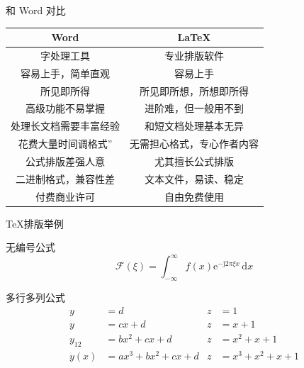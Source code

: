 \documentclass[xcolor=table,svgnames]{beamer}
\begin{document}
\begin{frame}{和 Word 对比}
  \begin{table}[h]
    \centering
    \begin{tabular}{c|c}
      Word & \LaTeX \\
      \hline
      字处理工具 & 专业排版软件 \\
      容易上手，简单直观 & 容易上手 \\
      所见即所得 & 所见即所想，所想即所得 \\
      高级功能不易掌握 & 进阶难，但一般用不到 \\
      处理长文档需要丰富经验 & 和短文档处理基本无异 \\
      花费大量时间调格式'' & 无需担心格式，专心作者内容 \\
      公式排版差强人意 & 尤其擅长公式排版 \\
      二进制格式，兼容性差 & 文本文件，易读、稳定 \\
      付费商业许可 & 自由免费使用 \\
    \end{tabular}
  \end{table}
\end{frame}

\begin{frame}{\TeX{}排版举例}
  \begin{exampleblock}{无编号公式}
  \begin{equation*}
    \mathcal{F}(\xi)=\int_{-\infty}^{\infty}
    f(x)\mathrm{e}^{-\mathrm{j}2\pi \xi x}\,\mathrm{d}x
  \end{equation*}
  \end{exampleblock}
  \begin{exampleblock}{多行多列公式}
\begin{align}
	y & =d & z & =1\\
	y & =cx+d & z & =x+1\\
	y_{12} & =bx^{2}+cx+d & z & =x^{2}+x+1\nonumber \\
	y(x) & =ax^{3}+bx^{2}+cx+d & z & =x^{3}+x^{2}+x+1
\end{align}
  \end{exampleblock}
\end{frame}
\end{document}
